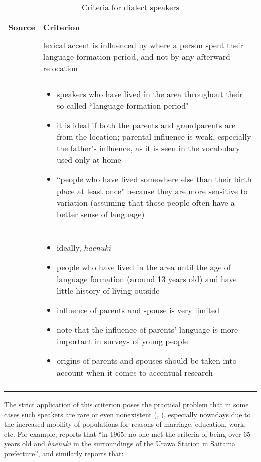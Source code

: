 \documentclass[output=paper,colorlinks,citecolor=brown]{langscibook}
\begin{document}
\begin{table}
\centering
\caption{Criteria for dialect speakers}
\label{tab:haenuki}
\begin{tabularx}{\textwidth}{ lQ }
\lsptoprule
Source & Criterion \\ \midrule
{}\\
  & lexical accent is influenced by where a person spent their language formation period, and not by any afterward relocation \\\addlinespace
{} \\
&  %
\begin{itemize}[nosep, noitemsep,leftmargin=0pt]
  \item speakers who have lived in the area throughout their so-called ``language formation period"
  \item it is ideal if both the parents and grandparents are from the location; parental influence is weak, especially the father’s influence, as it is seen in the vocabulary used only at home
  \item ``people who have lived somewhere else than their birth place at least once" because they are more sensitive to variation
(assuming that those people often have a better sense of language)
\end{itemize} \\\addlinespace
{} \\
 &  \begin{itemize}[nosep, noitemsep,leftmargin=0pt]
  \item ideally, \emph{haenuki}
  \item people who have lived in the area until the age of language formation (around 13 years old) and have little history of living outside
  \item influence of parents and spouse is very limited
  \item note that the influence of parents’ language is more important in surveys of young people
  \item origins of parents and spouses should be taken into account when it comes to accentual research
\end{itemize} \\
\lspbottomrule
\end{tabularx}
\end{table}

The strict application of this criterion poses the practical problem that in some cases such speakers are rare or even nonexistent (\citealt{Sibata1984}, \citealt{Sibata1988}), especially nowadays due to the increased mobility of populations for reasons of marriage, education, work, etc. For example, \citet[64, my translation]{Sibata1984} reports that ``in 1965, no one met the criteria of being over 65 years old and \emph{haenuki} in the surroundings of the Urawa Station in Saitama prefecture'', and similarly \citet[566, my translation]{Sibata1988} reports that:
\end{document}
